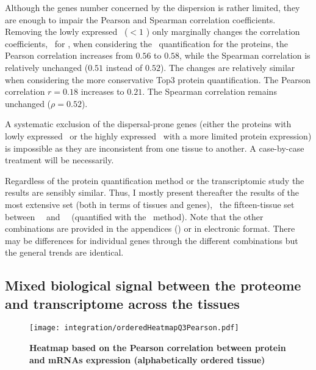 Although the genes number concerned by the dispersion is rather limited,
they are enough to impair the Pearson and Spearman correlation coefficients.
Removing the lowly expressed \mRNAs\ ($<1$ \FPKM) only marginally changes
the correlation coefficients,
\eg\ for \kidney,
when considering the \PPKM\ quantification for the proteins,
the Pearson correlation
increases from $0.56$ to $0.58$,
while the Spearman correlation is relatively unchanged
($0.51$ instead of $0.52$).
The changes are relatively similar
when considering the more conservative Top3 protein quantification.
The Pearson correlation $r=0.18$ increases to $0.21$.
The Spearman correlation remains unchanged ($\rho=0.52$).

A systematic exclusion of the dispersal-prone genes
(either the proteins with lowly expressed \mRNAs\
or the highly expressed \mRNAs\ with a more limited protein expression)
is impossible
as they are inconsistent from one tissue to another.\label{memo:dispersedGenes}
A case-by-case treatment will be necessarily.

Regardless of the protein quantification method or
the transcriptomic study %
the results are sensibly similar.
Thus, I mostly present thereafter the results of the most extensive set
(both in terms of tissues and genes),
\ie\ the fifteen-tissue set between \uhlen\ \etal\ and \pandey\ \etal\
(quantified with the \PPKM\ method).
Note that the other combinations are provided
in the appendices ()
or in electronic format.
There may be differences for individual genes through the different combinations
but the general trends are identical.

\vspace{2cm}
\subsection{Mixed biological signal between the proteome and transcriptome
across the tissues}

\begin{figure}[!hbt]
    \texttt{[image: integration/orderedHeatmapQ3Pearson.pdf]}\centering
    \vspace{-3mm}
    \caption[Heatmap based on the Pearson correlation between protein and mRNAs
    expression (alphabetically ordered tissue)]{\label{fig:orderedHeatmapPearson}%
    \textbf{Heatmap based on the Pearson correlation between protein and mRNAs
    expression (alphabetically ordered tissue)}}
\end{figure}

